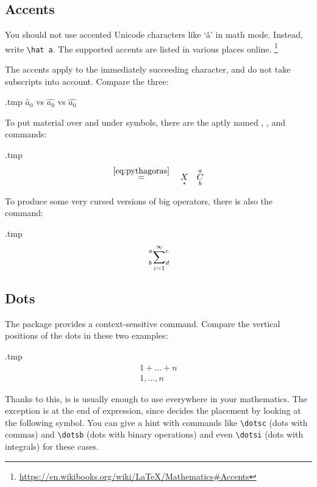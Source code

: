 \subsection{Accents}

You should not use accented Unicode characters like `â' in math mode.
Instead, write \verb|\hat a|.
The supported accents are listed in various places online.%
\footnote{\url{https://en.wikibooks.org/wiki/LaTeX/Mathematics\#Accents}}

\begin{gotcha}
The accents apply to the immediately succeeding character,
and do not take subscripts into account.
Compare the three:
%
\begin{VerbatimOut}{\jobname.tmp}
$\hat a_0$ vs $\hat {a_0}$
vs $\widehat {a_0}$
\end{VerbatimOut}
\ShowExample
\end{gotcha}

To put material over and under symbols,
there are the aptly named , , and  commands:
%
\begin{VerbatimOut}{\jobname.tmp}
\[
\overset{\eqref{eq:pythagoras}}{=}
\quad \underset{\ast}{X}
\quad \overunderset{a}{b}{C}
\]
\end{VerbatimOut}
\ShowExample
%
To produce some very cursed versions of big operators,
there is also the  command:
%
\begin{VerbatimOut}{\jobname.tmp}
\[
\sideset{^a_b}{^c_d}\sum_{i=1}^\infty
\]
\end{VerbatimOut}
\ShowExample



%
%
\subsection{Dots}

The  package provides a context-sensitive  command.
Compare the vertical positions of the dots in these two examples:
%
\begin{VerbatimOut}{\jobname.tmp}
\begin{gather*}
1 + \dots + n\\
1, \dots, n
\end{gather*}
\end{VerbatimOut}
\ShowExample
%
Thanks to this, is is usually enough to use  everywhere in your mathematics.
The exception is at the end of expression,
since  decides the placement by looking at the following symbol.
You can give a hint with commands like \verb|\dotsc| (dots with commas)
and \verb|\dotsb| (dots with binary operations)
and even \verb|\dotsi| (dots with integrals) for these cases.

